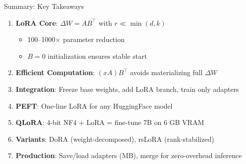 \documentclass[aspectratio=169,10pt]{beamer}
\begin{document}
\begin{frame}{Summary: Key Takeaways}
	\begin{enumerate}
		\item \textbf{LoRA Core}: $\Delta W = AB^\top$ with $r \ll \min(d, k)$
		      \begin{itemize}
			      \item 100--1000$\times$ parameter reduction
			      \item $B=0$ initialization ensures stable start
		      \end{itemize}

		\item \textbf{Efficient Computation}: $(xA)B^\top$ avoids materializing full $\Delta W$

		\item \textbf{Integration}: Freeze base weights, add LoRA branch, train only adapters

		\item \textbf{PEFT}: One-line LoRA for any HuggingFace model

		\item \textbf{QLoRA}: 4-bit NF4 + LoRA = fine-tune 7B on 6 GB VRAM

		\item \textbf{Variants}: DoRA (weight-decomposed), rsLoRA (rank-stabilized)

		\item \textbf{Production}: Save/load adapters (MB), merge for zero-overhead inference
	\end{enumerate}
\end{frame}
\end{document}
